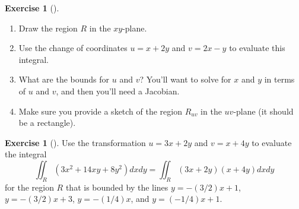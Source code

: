 \documentclass[10pt,]{book}
\theoremstyle{plain}
\theoremstyle{definition}
\theoremstyle{definition}
\theoremstyle{definition}
\theoremstyle{definition}
\newtheorem{exploration}[project]{Exercise}
\theoremstyle{definition}
\numberwithin{equation}{section}
\begin{document}
\begin{exploration}[]\label{exploration-269}
\leavevmode%
\begin{enumerate}[font=\bfseries,label=(\alph*),ref=\alph*]
\item\label{task-732} Draw the region \(R\) in the \(xy\)-plane.%
\item\label{task-733} Use the change of coordinates \(u=x+2y\) and \(v=2x-y\) to evaluate this integral.%
\item\label{task-734} What are the bounds for \(u\) and \(v\)?  You'll want to solve for \(x\) and \(y\) in terms of \(u\) and \(v\), and then you'll need a Jacobian.%
\item\label{task-735} Make sure you provide a sketch of the region \(R_{uv}\) in the \(uv\)-plane (it should be a rectangle).%
\end{enumerate}
\end{exploration}
\begin{exploration}[]\label{exploration-270}
Use the transformation \(u=3x+2y\) and \(v=x+4y\) to evaluate the integral%
\begin{equation*}
\iint_R (3x^2+14xy+8y^2)dxdy =\iint_R (3x+2y)(x+4y)dxdy
\end{equation*}
for the region \(R\) that is bounded by the lines \(y=-(3/2)x+1\), \(y=-(3/2)x+3\), \(y=-(1/4)x\), and \(y=(-1/4)x+1\).%
\end{exploration}
\typeout{************************************************}
\typeout{************************************************}
\end{document}
